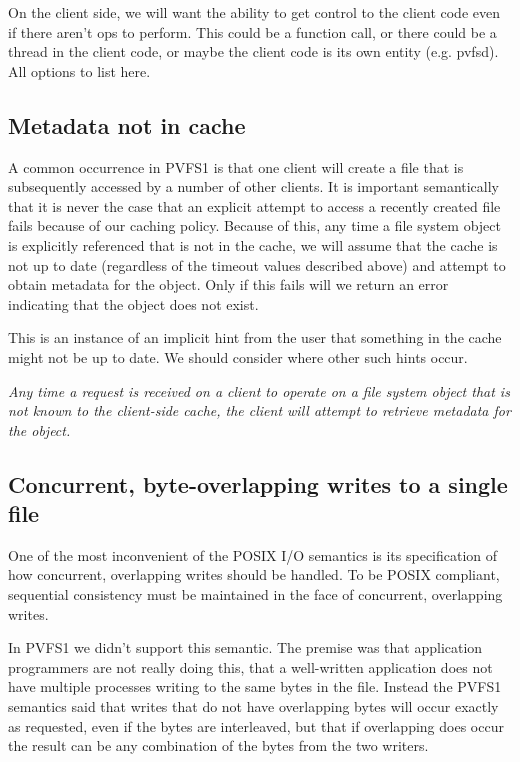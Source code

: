 \documentclass[10pt]{article} %
\begin{document}
On the client side, we will want the ability to get control to the client code
even if there aren't ops to perform.  This could be a function call, or there
could be a thread in the client code, or maybe the client code is its own
entity (e.g. pvfsd).  All options to list here.

%
%
\subsection{Metadata not in cache}

A common occurrence in PVFS1 is that one client will create a file that is
subsequently accessed by a number of other clients.  It is important
semantically that it is never the case that an explicit attempt to access a
recently created file fails because of our caching policy.  Because of this,
any time a file system object is explicitly referenced that is not in the
cache, we will assume that the cache is not up to date (regardless of the
timeout values described above) and attempt to obtain metadata for the
object.  Only if this fails will we return an error indicating that the object
does not exist.

This is an instance of an implicit hint from the user that something in the
cache might not be up to date.  We should consider where other such hints
occur.

\emph{ Any time a request is received on a client to operate on a file system
object that is not known to the client-side cache, the client will attempt to
retrieve metadata for the object.}

%
%
\subsection{Concurrent, byte-overlapping writes to a single file}

One of the most inconvenient of the POSIX I/O semantics is its specification
of how concurrent, overlapping writes should be handled.  To be POSIX
compliant, sequential consistency must be maintained in the face of
concurrent, overlapping writes.

In PVFS1 we didn't support this semantic.  The premise was that application
programmers are not really doing this, that a well-written application does
not have multiple processes writing to the same bytes in the file.  Instead
the PVFS1 semantics said that writes that do not have overlapping bytes will
occur exactly as requested, even if the bytes are interleaved, but that if
overlapping does occur the result can be any combination of the bytes from the
two writers.
\end{document}
